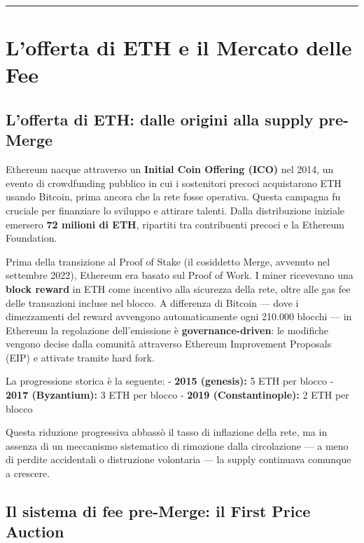 \documentclass[
  italian,
  openany]{book}
\begin{document}
\begin{center}\rule{0.5\linewidth}{0.5pt}\end{center}

\section{L'offerta di ETH e il Mercato delle
Fee}\label{lofferta-di-eth-e-il-mercato-delle-fee}

\subsection{L'offerta di ETH: dalle origini alla supply
pre-Merge}\label{lofferta-di-eth-dalle-origini-alla-supply-pre-merge}

Ethereum nacque attraverso un \textbf{Initial Coin Offering (ICO)} nel
2014, un evento di crowdfunding pubblico in cui i sostenitori precoci
acquistarono ETH usando Bitcoin, prima ancora che la rete fosse
operativa. Questa campagna fu cruciale per finanziare lo sviluppo e
attirare talenti. Dalla distribuzione iniziale emersero \textbf{72
milioni di ETH}, ripartiti tra contribuenti precoci e la Ethereum
Foundation.

Prima della transizione al Proof of Stake (il cosiddetto Merge, avvenuto
nel settembre 2022), Ethereum era basato sul Proof of Work. I miner
ricevevano una \textbf{block reward} in ETH come incentivo alla
sicurezza della rete, oltre alle gas fee delle transazioni incluse nel
blocco. A differenza di Bitcoin --- dove i dimezzamenti del reward
avvengono automaticamente ogni 210.000 blocchi --- in Ethereum la
regolazione dell'emissione è \textbf{governance-driven}: le modifiche
vengono decise dalla comunità attraverso Ethereum Improvement Proposals
(EIP) e attivate tramite hard fork.

La progressione storica è la seguente: - \textbf{2015 (genesis):} 5 ETH
per blocco - \textbf{2017 (Byzantium):} 3 ETH per blocco - \textbf{2019
(Constantinople):} 2 ETH per blocco

Questa riduzione progressiva abbassò il tasso di inflazione della rete,
ma in assenza di un meccanismo sistematico di rimozione dalla
circolazione --- a meno di perdite accidentali o distruzione volontaria
--- la supply continuava comunque a crescere.

\subsection{Il sistema di fee pre-Merge: il First Price
Auction}\label{il-sistema-di-fee-pre-merge-il-first-price-auction}
\end{document}
